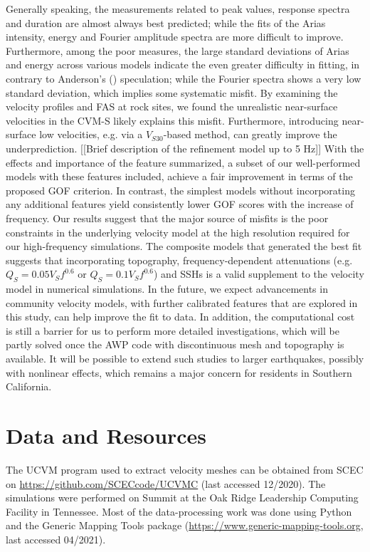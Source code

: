 Generally speaking, the measurements related to peak values, response spectra and duration are almost always best predicted; while the fits of the Arias intensity, energy and Fourier amplitude spectra are more difficult to improve. Furthermore, among the poor measures, the large standard deviations of Arias and energy across various models indicate the even greater difficulty in fitting, in contrary to Anderson’s (\citeyear{andersonQuantitativeMeasureGoodnessOfFit2004}) speculation; while the Fourier spectra shows a very low standard deviation, which implies some systematic misfit. By examining the velocity profiles and FAS at rock sites, we found the unrealistic near-surface velocities in the CVM-S likely explains this misfit. Furthermore, introducing near-surface low velocities, e.g. via a $V_{S30}$-based method, can greatly improve the underprediction. [[Brief description of the refinement model up to 5 Hz]]
With the effects and importance of the feature summarized, a subset of our well-performed models with these features included, achieve a fair improvement in terms of the proposed GOF criterion. In contrast, the simplest models without incorporating any additional features yield consistently lower GOF scores with the increase of frequency. Our results suggest that the major source of misfits is the poor constraints in the underlying velocity model at the high resolution required for our high-frequency simulations.  The composite models that generated the best fit suggests that incorporating topography, frequency-dependent attenuations (e.g. $Q_S=0.05V_Sf^{0.6}$ or $Q_S=0.1V_Sf^{0.6}$) and SSHs is a valid supplement to the velocity model in numerical simulations.
In the future, we expect advancements in community velocity models, with further calibrated features that are explored in this study, can help improve the fit to data. In addition, the computational cost is still a barrier for us to perform more detailed investigations, which will be partly solved once the AWP code with discontinuous mesh and topography is available. It will be possible to extend such studies to larger earthquakes, possibly with nonlinear effects, which remains a major concern for residents in Southern California.


\section*{Data and Resources}
The UCVM program used to extract velocity meshes can be obtained from SCEC on \url{https://github.com/SCECcode/UCVMC} (last accessed 12/2020). The simulations were performed on Summit at the Oak Ridge Leadership Computing Facility in Tennessee. Most of the data-processing work was done using Python and the Generic Mapping Tools package (\url{https://www.generic-mapping-tools.org}, last accessed 04/2021).


